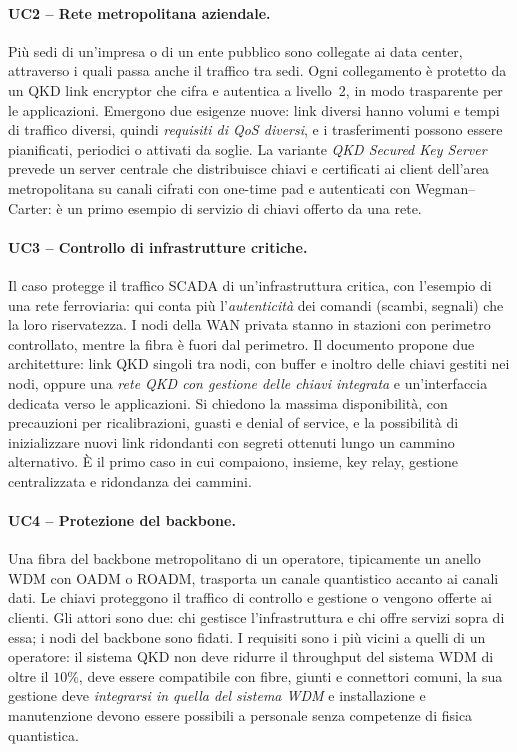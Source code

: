 \paragraph{UC2 – Rete metropolitana aziendale.}
Più sedi di un'impresa o di un ente pubblico sono collegate ai data
center, attraverso i quali passa anche il traffico tra sedi. Ogni
collegamento è protetto da un QKD link encryptor che cifra e autentica a
livello~2, in modo trasparente per le applicazioni. Emergono due esigenze
nuove: link diversi hanno volumi e tempi di traffico diversi, quindi
\emph{requisiti di QoS diversi}, e i trasferimenti possono essere
pianificati, periodici o attivati da soglie. La variante
\emph{QKD Secured Key Server} prevede un server centrale che distribuisce
chiavi e certificati ai client dell'area metropolitana su canali cifrati
con one-time pad e autenticati con Wegman–Carter: è un primo esempio di
servizio di chiavi offerto da una rete.

\paragraph{UC3 – Controllo di infrastrutture critiche.}
Il caso protegge il traffico SCADA di un'infrastruttura critica, con
l'esempio di una rete ferroviaria: qui conta più l'\emph{autenticità} dei
comandi (scambi, segnali) che la loro riservatezza. I nodi della WAN privata
stanno in stazioni con perimetro controllato, mentre la fibra è fuori dal
perimetro. Il documento propone due architetture: link QKD singoli tra
nodi, con buffer e inoltro delle chiavi gestiti nei nodi, oppure una
\emph{rete QKD con gestione delle chiavi integrata} e un'interfaccia
dedicata verso le applicazioni. Si chiedono la massima disponibilità, con
precauzioni per ricalibrazioni, guasti e denial of service, e la
possibilità di inizializzare nuovi link ridondanti con segreti ottenuti
lungo un cammino alternativo. È il primo caso in cui compaiono, insieme,
key relay, gestione centralizzata e ridondanza dei cammini.

\paragraph{UC4 – Protezione del backbone.}
Una fibra del backbone metropolitano di un operatore, tipicamente un anello
WDM con OADM o ROADM, trasporta un canale quantistico accanto ai canali
dati. Le chiavi proteggono il traffico di controllo e gestione o vengono
offerte ai clienti. Gli attori sono due: chi gestisce l'infrastruttura e
chi offre servizi sopra di essa; i nodi del backbone sono fidati. I
requisiti sono i più vicini a quelli di un operatore: il sistema QKD non
deve ridurre il throughput del sistema WDM di oltre il $10\%$, deve essere
compatibile con fibre, giunti e connettori comuni, la sua gestione deve
\emph{integrarsi in quella del sistema WDM} e installazione e manutenzione
devono essere possibili a personale senza competenze di fisica quantistica.

